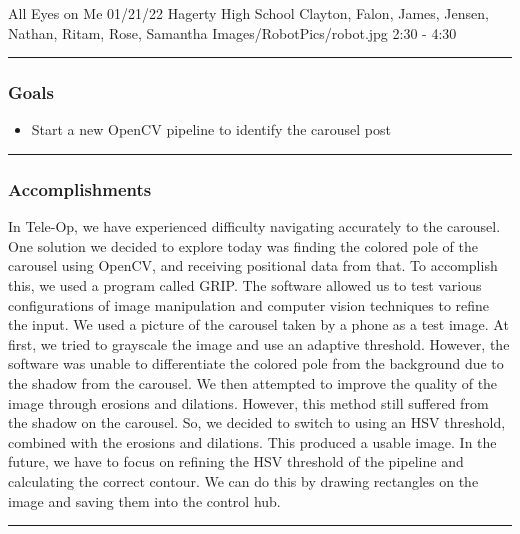 \insertmeeting 
	{All Eyes on Me} 
	{01/21/22} 
	{Hagerty High School}
	{Clayton, Falon, James, Jensen, Nathan, Ritam, Rose, Samantha}
	{Images/RobotPics/robot.jpg}
	{2:30 - 4:30}
	
\noindent\hfil\rule{\textwidth}{.4pt}\hfil
\subsubsection*{Goals}
\begin{itemize}
    \item Start a new OpenCV pipeline to identify the carousel post 

\end{itemize} 

\noindent\hfil\rule{\textwidth}{.4pt}\hfil

\subsubsection*{Accomplishments}
In Tele-Op, we have experienced difficulty navigating accurately to the carousel. One solution we decided to explore today was finding the colored pole of the carousel using OpenCV, and receiving positional data from that. To accomplish this, we used a program called GRIP. The software allowed us to test various configurations of image manipulation and computer vision techniques to refine the input. We used a picture of the carousel taken by a phone as a test image. At first, we tried to grayscale the image and use an adaptive threshold. However, the software was unable to differentiate the colored pole from the background due to the shadow from the carousel. We then attempted to improve the quality of the image through erosions and dilations. However, this method still suffered from the shadow on the carousel. So, we decided to switch to using an HSV threshold, combined with the erosions and dilations. This produced a usable image. In the future, we have to focus on refining the HSV threshold of the pipeline and calculating the correct contour. We can do this by drawing rectangles on the image and saving them into the control hub. 


\noindent\hfil\rule{\textwidth}{.4pt}\hfil
